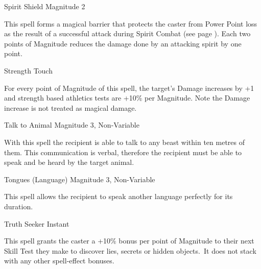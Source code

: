 \begin{rpg-spell}
{Spirit Shield}
{Magnitude 2}

This spell forms a magical barrier that protects the caster from Power Point loss as the result of a successful attack during Spirit Combat (see page \pageref{ssec:spirit-combat}). Each two points of Magnitude reduces the damage done by an attacking spirit by one point.
\end{rpg-spell}


\begin{rpg-spell}
{Strength}
{Touch}

For every point of Magnitude of this spell, the target’s Damage increases by +1 and strength based athletics tests are +10\% per Magnitude. Note the Damage increase is not treated as magical damage.
\end{rpg-spell}


\begin{rpg-spell}
{Talk to Animal}
{Magnitude 3, Non-Variable}

With this spell the recipient is able to talk to any beast within ten metres of them. This communication is verbal, therefore the recipient must be able to speak and be heard by the target animal. 
\end{rpg-spell}


%


\begin{rpg-spell}
{Tongues (Language)}
{Magnitude 3, Non-Variable} %

This spell allows the recipient to speak another language perfectly for its duration. %
\end{rpg-spell}


\begin{rpg-spell}
{Truth Seeker}
{Instant}

This spell grants the caster a +10\% bonus per point of Magnitude to their next Skill Test they make to discover lies, secrets or hidden objects. It does not stack with any other spell-effect bonuses.
\end{rpg-spell}


